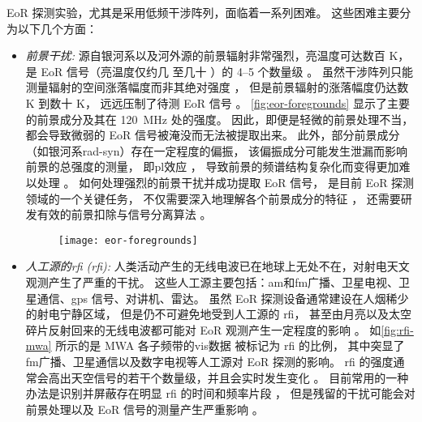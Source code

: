 EoR 探测实验，尤其是采用低频干涉阵列，面临着一系列困难。
这些困难主要分为以下几个方面：
\begin{itemize}
\item
\emph{前景干扰:}
源自银河系以及河外源的前景辐射非常强烈，亮温度可达数百 \si{\kelvin}，
是 EoR 信号（亮温度仅约几 \si{\mK} 至几十 \si{\mK}）的 \numrange{4}{5} 个数量级
\cite{morales2010}。
虽然干涉阵列只能测量辐射的空间涨落幅度而非其绝对强度 \cite{braun1985}，
但是前景辐射的涨落幅度仍达数 \si{\kelvin} 到数十 \si{\kelvin}，
远远压制了待测 EoR 信号 \cite{zaroubi2013}。
\autoref{fig:eor-foregrounds} 显示了主要的前景成分及其在 \SI{120}{\MHz} 处的强度。
因此，即便是轻微的前景处理不当，都会导致微弱的 EoR 信号被淹没而无法被提取出来。
此外，部分前景成分（如银河系\ac{rad-syn}）存在一定程度的偏振，
该偏振成分可能发生泄漏而影响前景的总强度的测量，
即\ac{pl}效应 \cite{cotton1999,reid2008}，
导致前景的频谱结构复杂化而变得更加难以处理
\cite{jelic2014,asad2015,asad2016,asad2018,gehlot2018}。
如何处理强烈的前景干扰并成功提取 EoR 信号，
是目前 EoR 探测领域的一个关键任务，
不仅需要深入地理解各个前景成分的特征
\cite{jelic2008,jelic2010,wang2010,liu2012,offringa2016,
  carroll2016,murray2017,procopio2017,spinelli2018}，
还需要研发有效的前景扣除与信号分离算法
\cite{wang2006,jelic2008,harker2009,liu2009fgrm,chapman2012,chapman2013,
  gu2013,wang2013,bonaldi2015,chapman2015,chapman2016,mertens2018}。

\begin{figure}[htp]
  \centering
  \texttt{[image: eor-foregrounds]}
  \label{fig:eor-foregrounds}
\end{figure}

\item
\emph{人工源的\acl{rfi} (\ac{rfi}):}
人类活动产生的无线电波已在地球上无处不在，对射电天文观测产生了严重的干扰。
这些人工源主要包括：\ac{am}和\ac{fm}广播、卫星电视、卫星通信、\ac{gps} 信号、对讲机、雷达。
虽然 EoR 探测设备通常建设在人烟稀少的射电宁静区域，
但是仍不可避免地受到人工源的 \ac{rfi}，
甚至由月亮以及太空碎片反射回来的无线电波都可能对 EoR 观测产生一定程度的影响
\cite{mcKinley2013,tingay2013rfi}。
如\autoref{fig:rfi-mwa} 所示的是 MWA 各子频带的\ac{vis}数据
被标记为 \ac{rfi} 的比例，
其中突显了\ac{fm}广播、卫星通信以及数字电视等人工源对 EoR 探测的影响。
\ac{rfi} 的强度通常会高出天空信号的若干个数量级，并且会实时发生变化 \cite{bentum2011}。
目前常用的一种办法是识别并屏蔽存在明显 \ac{rfi} 的时间和频率片段
\cite{fridman2001,offringa2010,offringa2012,prasad2012,akeret2017}，
但是残留的干扰可能会对前景处理以及 EoR 信号的测量产生严重影响 \cite{offringa2015}。


\end{itemize}
